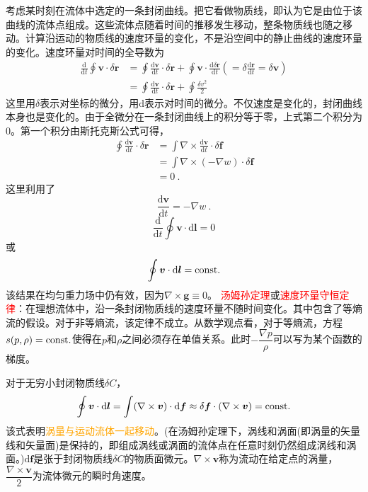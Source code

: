 \documentclass[12pt,a4paper]{article}
\renewcommand{\vec}[1]{\boldsymbol{#1}}
\newcommand{\dif}{\mathrm{d}}
\begin{document}
考虑某时刻在流体中选定的一条封闭曲线。把它看做物质线，即认为它是由位于该曲线的流体点组成。这些流体点随着时间的推移发生移动，整条物质线也随之移动。计算沿运动的物质线的速度环量的变化，不是沿空间中的静止曲线的速度环量的变化。速度环量对时间的全导数为
\begin{align*}
\frac{\dif }{\dif t} \oint \vec{v} \cdot \delta \vec{r} &= \oint \frac{\dif \vec{v}}{\dif t} \cdot \delta \vec{r} +\oint \vec{v} \cdot \frac{\dif \delta \vec{r}}{\dif t} \left(= \delta \frac{\dif \vec{r}}{\dif t} = \delta \vec{v}\right)\\
&=  \oint \frac{\dif \vec{v}}{\dif t} \cdot \delta \vec{r} +\oint \frac{\delta v^2}{2}
\end{align*}
这里用$\delta$表示对坐标的微分，用$\dif$表示对时间的微分。不仅速度是变化的，封闭曲线本身也是变化的。由于全微分在一条封闭曲线上的积分等于零，上式第二个积分为$0$。第一个积分由斯托克斯公式可得，
\begin{align*}
\oint \frac{\dif \vec{v}}{\dif t} \cdot \delta \vec{r} &= \int \nabla \times \frac{\dif \vec{v}}{\dif t} \cdot \delta \vec{f} \\ 
&= \int \nabla \times (-\nabla w) \cdot \delta \vec{f} \\
&= 0 ~.
\end{align*}
这里利用了
\begin{equation*}
 \frac{\dif \vec{v}}{\dif t} = -\nabla w ~.
\end{equation*}
\begin{equation}
\frac{\dif }{\dif t} \oint \vec{v} \cdot \dif \vec{l}  = 0
\end{equation}
或
\begin{equation}
\oint \vec{v} \cdot \dif \vec{l} = {\rm const.}
\end{equation}
该结果在均匀重力场中仍有效，因为$\nabla \times \vec{g} \equiv 0$。
\textcolor{red}{汤姆孙定理}或\textcolor{red}{速度环量守恒定律}：在理想流体中，沿一条封闭物质线的速度环量不随时间变化。其中包含了等熵流的假设。对于非等熵流，该定律不成立。从数学观点看，对于等熵流，方程$s(p, \rho) = {\rm const.}$使得在$p$和$\rho$之间必须存在单值关系。此时$-\dfrac{\nabla p}{\rho}$可以写为某个函数的梯度。

对于无穷小封闭物质线$\delta C$，
\begin{equation}
\oint \vec{v} \cdot \dif \vec{l} = \int (\nabla \times \vec{v}) \cdot \dif \vec{f} \approx \delta \vec{f} \cdot (\nabla \times \vec{v}) = {\rm const.}
\end{equation}
该式表明\textcolor{orange}{涡量与运动流体一起移动}。(在汤姆孙定理下，涡线和涡面(即涡量的矢量线和矢量面)是保持的，即组成涡线或涡面的流体点在任意时刻仍然组成涡线和涡面。)$\dif \vec{f}$是张于封闭物质线$\delta C$的物质面微元。$\nabla \times \vec{v}$称为流动在给定点的涡量，$\dfrac{\nabla \times \vec{v}}{2}$为流体微元的瞬时角速度。
\end{document}
